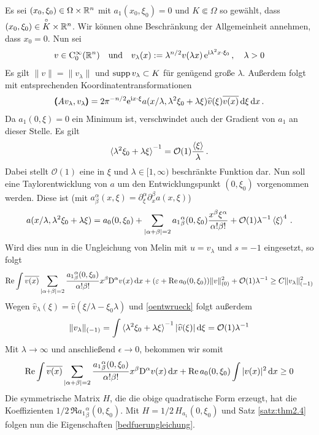 Es sei $(x_0,\xi_0)\in\Omega\times\mathbb R^n$ mit $a_1(x_0,\xi_0)=0$ und $K\Subset \Omega$ so gewählt, dass  $(x_0,\xi_0)\in \overset{\circ} {K}\times\mathbb R^n$. Wir können ohne Beschränkung der Allgemeinheit annehmen, dass $x_0=0$. 
Nun sei 
\begin{align}
 v\in\mathrm C^\infty_0(\mathbb R^n) \quad \text{und} \quad v_\lambda(x):=\lambda^{n/2}v(\lambda x)\, \mathrm e^{\mathrm i\lambda^2x\cdot \xi_0}\, ,\quad\lambda>0
\end{align}
Es gilt $\|v\|=\|v_\lambda\|$ und $\operatorname{supp} v_\lambda \subset K$ für genügend große $\lambda$. Außerdem folgt mit entsprechenden Koordinatentransformationen
\begin{align}
\pmb(A v_\lambda,v_\lambda\pmb) = {2\pi}^{-n/2}\relax \mathrm e^{\mathrm i x\cdot \xi} a(x/\lambda,\lambda^2\xi_0 + \lambda\xi)\widehat v(\xi)\overline{v(x)}\,\mathrm d\xi\,\mathrm d x\,.
\end{align}
Da $a_1(0,\xi)=0$ ein Minimum  ist, verschwindet auch der Gradient von $a_1$ an dieser Stelle. Es gilt
\begin{align}\label{oentwrueck}
\braket{\lambda^2\xi_0 + \lambda\xi}^{-1} = \mathcal O(1)\frac{\braket{\xi}}{\lambda}\,.
\end{align}
Dabei stellt $\mathcal O(1)$ eine in $\xi$ und $\lambda\in[1,\infty)$ beschränkte Funktion dar. Nun soll eine Taylorentwicklung von $a$ um den Entwicklungspunkt $(0,\xi_0)$ vorgenommen werden. Diese ist (mit $a^\alpha_\beta(x,\xi) = \partial_\xi^\alpha \partial_x^\beta a(x,\xi)$)
\begin{align}
a(x/\lambda, \lambda^2\xi_0+\lambda\xi) = a_0(0,\xi_0) + \sum_{\lvert\alpha+\beta\rvert=2} {a_1}^\alpha_\beta(0,\xi_0)\frac{x^\beta\xi^\alpha}{\alpha!\beta!} + \mathcal O(1) \lambda^{-1}\braket{\xi}^4\,.
\end{align}
Wird dies nun in die Ungleichung von Melin mit $u=v_\lambda$ und $s=-1$ eingesetzt, so folgt
\begin{align}
\operatorname{Re}\int \overline{v(x)}\sum_{\lvert\alpha+\beta\rvert=2}\frac{{a_1}^\alpha_\beta(0,\xi_0)}{\alpha!\beta!}x^\beta\mathrm D^\alpha v(x)\,\mathrm d x + (\varepsilon +\operatorname{Re} a_0(0,\xi_0))\|v\|_{(0)}^2 + \mathcal O(1)\lambda^{-1}\ge C\|v_\lambda\|_{(-1)}^2
\end{align}
Wegen $\widehat{v}_\lambda(\xi)=\widehat{v}(\xi/\lambda-\xi_0\lambda)$ und \eqref{oentwrueck} folgt außerdem
\begin{align}
\|v_\lambda\|_{(-1)} = \int \braket{\lambda^2\xi_0+\lambda \xi}^{-1}|\widehat{v}(\xi)|\,\mathrm d\xi = \mathcal{O}(1)\lambda^{-1} 
\end{align}
Mit $\lambda\to\infty$ und anschließend $\epsilon \to 0$, bekommen wir somit
\begin{align}
\operatorname{Re}\int \overline{v(x)}\sum_{\lvert\alpha+\beta\rvert=2}\frac{{a_1}^\alpha_\beta(0,\xi_0)}{\alpha!\beta!}x^\beta\mathrm D^\alpha v(x)\,\mathrm d x + \operatorname{Re} a_0(0,\xi_0)\int|v(x)|^2\,\mathrm d x\ge 0
\end{align}
Die symmetrische Matrix $H$, die die obige quadratische Form erzeugt, hat die Koeffizienten $1/2\,\Re {a_1}^\alpha_\beta(0,\xi_0)$. Mit $H=1/2\, H_{a_1}(0,\xi_0)$ und Satz \ref{satz:thm2.4} folgen nun die Eigenschaften \eqref{bedfuerungleichung}.

